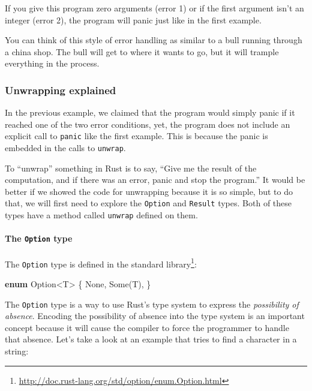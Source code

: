 \documentclass[a4paper,]{book}
\renewcommand*{\hypertarget}[3][\ar]{%
  \def\ar{#2}%
  \label{#1}%
  #3}
\newenvironment{Shaded}{\begin{snugshade}}{\end{snugshade}}
\newcommand{\KeywordTok}[1]{\textcolor[rgb]{0.13,0.29,0.53}{\textbf{{#1}}}}
\newcommand{\DataTypeTok}[1]{\textcolor[rgb]{0.13,0.29,0.53}{{#1}}}
\newcommand{\ConstantTok}[1]{\textcolor[rgb]{0.00,0.00,0.00}{{#1}}}
\newcommand{\NormalTok}[1]{{#1}}
\renewcommand{\href}[2]{#2\footnote{\url{#1}}}
\let\oldparagraph\paragraph
\renewcommand{\paragraph}[1]{\oldparagraph{#1}\mbox{}}
\begin{document}
If you give this program zero arguments (error 1) or if the first
argument isn't an integer (error 2), the program will panic just like in
the first example.

You can think of this style of error handling as similar to a bull
running through a china shop. The bull will get to where it wants to go,
but it will trample everything in the process.

\hypertarget{unwrapping-explained}{\subsubsection{Unwrapping
explained}\label{unwrapping-explained}}

In the previous example, we claimed that the program would simply panic
if it reached one of the two error conditions, yet, the program does not
include an explicit call to \texttt{panic} like the first example. This
is because the panic is embedded in the calls to \texttt{unwrap}.

To ``unwrap'' something in Rust is to say, ``Give me the result of the
computation, and if there was an error, panic and stop the program.'' It
would be better if we showed the code for unwrapping because it is so
simple, but to do that, we will first need to explore the
\texttt{Option} and \texttt{Result} types. Both of these types have a
method called \texttt{unwrap} defined on them.

\hypertarget{the-option-type}{\paragraph{\texorpdfstring{The
\texttt{Option} type}{The Option type}}\label{the-option-type}}

The \texttt{Option} type is
\href{http://doc.rust-lang.org/std/option/enum.Option.html}{defined in
the standard library}:

\begin{Shaded}
\begin{Highlighting}[]
\KeywordTok{enum} \DataTypeTok{Option}\NormalTok{<T> \{}
    \ConstantTok{None}\NormalTok{,}
    \ConstantTok{Some}\NormalTok{(T),}
\NormalTok{\}}
\end{Highlighting}
\end{Shaded}

The \texttt{Option} type is a way to use Rust's type system to express
the \emph{possibility of absence}. Encoding the possibility of absence
into the type system is an important concept because it will cause the
compiler to force the programmer to handle that absence. Let's take a
look at an example that tries to find a character in a string:
\end{document}
